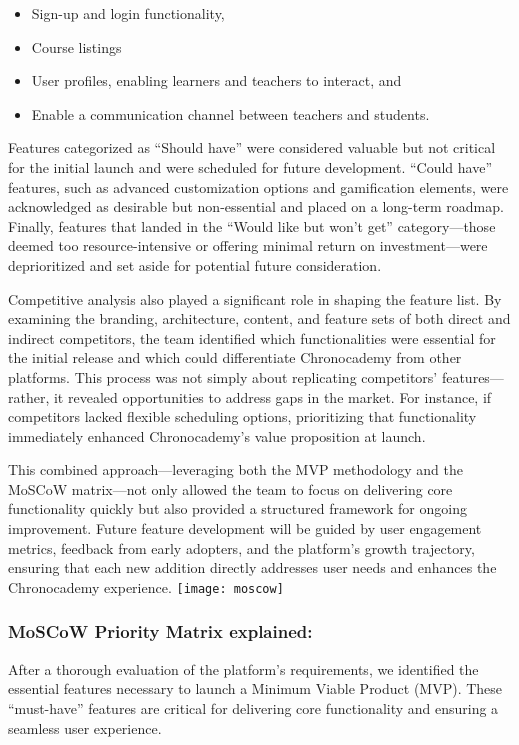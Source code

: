 \begin{itemize}
    \item Sign-up and login functionality,
    \item Course listings
    \item User profiles, enabling learners and teachers to interact, and
    \item Enable a communication channel between teachers and students.
\end{itemize}
Features categorized as ``Should have'' were considered valuable but not critical for the initial launch and were scheduled for future development.
``Could have'' features, such as advanced customization options and gamification elements, were acknowledged as desirable but non-essential and placed on a long-term roadmap.
Finally, features that landed in the ``Would like but won’t get'' category—those deemed too resource-intensive or offering minimal return on investment—were deprioritized and set aside for potential future consideration.

Competitive analysis also played a significant role in shaping the feature list.
By examining the branding, architecture, content, and feature sets of both direct and indirect competitors, the team identified which functionalities were essential for the initial release and which could differentiate Chronocademy from other platforms.
This process was not simply about replicating competitors’ features—rather, it revealed opportunities to address gaps in the market.
For instance, if competitors lacked flexible scheduling options, prioritizing that functionality immediately enhanced Chronocademy’s value proposition at launch.

This combined approach—leveraging both the MVP methodology and the MoSCoW matrix—not only allowed the team to focus on delivering core functionality quickly but also provided a structured framework for ongoing improvement.
Future feature development will be guided by user engagement metrics, feedback from early adopters, and the platform’s growth trajectory, ensuring that each new addition directly addresses user needs and enhances the Chronocademy experience.
\newline\newline
\texttt{[image: moscow]}

\subsubsection{MoSCoW Priority Matrix explained:}
After a thorough evaluation of the platform's requirements, we identified the essential features necessary to launch a Minimum Viable Product (MVP). These ``must-have'' features are critical for delivering core functionality and ensuring a seamless user experience.

